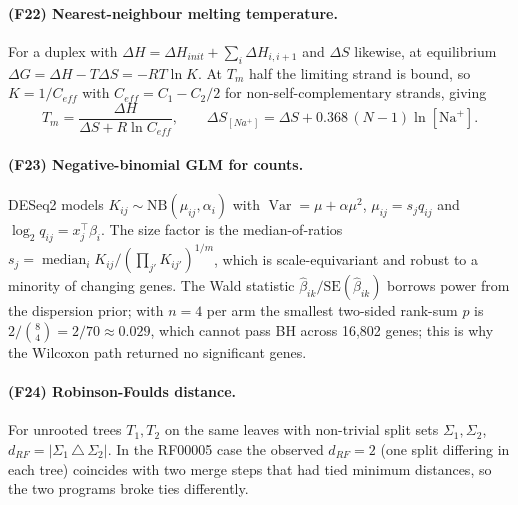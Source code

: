 \paragraph{(F22) Nearest-neighbour melting temperature.} For a duplex with
$\Delta H=\Delta H_{init}+\sum_{i}\Delta H_{i,i+1}$ and $\Delta S$ likewise, at equilibrium
$\Delta G=\Delta H-T\Delta S=-RT\ln K$. At $T_m$ half the limiting strand is bound, so
$K=1/C_{eff}$ with $C_{eff}=C_1-C_2/2$ for non-self-complementary strands, giving
\begin{equation}
T_m=\frac{\Delta H}{\Delta S+R\ln C_{eff}},\qquad
\Delta S_{[Na^+]}=\Delta S+0.368\,(N-1)\ln[\mathrm{Na}^+].
\end{equation}

\paragraph{(F23) Negative-binomial GLM for counts.} DESeq2 models $K_{ij}\sim\mathrm{NB}(\mu_{ij},\alpha_i)$ with
$\operatorname{Var}=\mu+\alpha\mu^2$, $\mu_{ij}=s_jq_{ij}$ and $\log_2 q_{ij}=x_j^\top\beta_i$. The size factor
is the median-of-ratios $s_j=\operatorname{median}_i K_{ij}/(\prod_{j'}K_{ij'})^{1/m}$, which is scale-equivariant and
robust to a minority of changing genes. The Wald statistic $\hat\beta_{ik}/\mathrm{SE}(\hat\beta_{ik})$ borrows power from the
dispersion prior; with $n=4$ per arm the smallest two-sided rank-sum $p$ is $2/\binom{8}{4}=2/70\approx0.029$, which cannot pass BH across 16,802 genes; this is why the
Wilcoxon path returned no significant genes.

\paragraph{(F24) Robinson-Foulds distance.} For unrooted trees $T_1,T_2$ on the same leaves with
non-trivial split sets $\Sigma_1,\Sigma_2$, $d_{RF}=|\Sigma_1\,\triangle\,\Sigma_2|$. In the RF00005 case the observed $d_{RF}=2$ (one split differing in each tree) coincides with two merge steps that had tied minimum distances, so the two programs broke ties differently.
